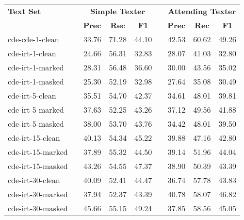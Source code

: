\begin{tabular}{ l c r r r c r r r }
    \toprule

    \multicolumn{1}{l}{\textbf{Text Set}} & \phantom &
    \multicolumn{3}{c}{\textbf{Simple Texter}} & \phantom &
    \multicolumn{3}{c}{\textbf{Attending Texter}} \\

    \cmidrule{3-5}
    \cmidrule{7-9}

    \multicolumn{1}{c}{} & \phantom{abc} &
    \multicolumn{1}{c}{\textbf{Prec}} &
    \multicolumn{1}{c}{\textbf{Rec}} &
    \multicolumn{1}{c}{\textbf{F1}} & \phantom{abc} &
    \multicolumn{1}{c}{\textbf{Prec}} &
    \multicolumn{1}{c}{\textbf{Rec}} &
    \multicolumn{1}{c}{\textbf{F1}} \\

    \midrule

    cde-cde-1-clean   && 33.76 & 71.28 & 44.10 && 42.53 & 60.62 & 49.26 \\

    \addlinespace

    cde-irt-1-clean   && 24.66 & 56.31 & 32.83 && 28.07 & 41.03 & 32.80 \\
    cde-irt-1-marked  && 28.31 & 56.48 & 36.60 && 30.00 & 43.56 & 35.02 \\
    cde-irt-1-masked  && 25.30 & 52.19 & 32.98 && 27.64 & 35.08 & 30.49 \\

    \addlinespace

    cde-irt-5-clean   && 35.51 & 54.70 & 42.37 && 34.61 & 48.01 & 39.81 \\
    cde-irt-5-marked  && 37.63 & 52.25 & 43.26 && 37.12 & 49.56 & 41.88 \\
    cde-irt-5-masked  && 38.00 & 53.70 & 43.76 && 34.42 & 48.01 & 39.50 \\

    \addlinespace

    cde-irt-15-clean  && 40.13 & 54.34 & 45.22 && 39.88 & 47.16 & 42.80 \\
    cde-irt-15-marked && 37.89 & 55.32 & 44.50 && 39.14 & 51.96 & 44.04 \\
    cde-irt-15-masked && 43.26 & 54.55 & 47.37 && 38.90 & 50.39 & 43.39 \\

    \addlinespace

    cde-irt-30-clean  && 40.09 & 52.41 & 44.47 && 36.74 & 57.78 & 43.83 \\
    cde-irt-30-marked && 37.94 & 52.37 & 43.39 && 40.78 & 58.07 & 46.82 \\
    cde-irt-30-masked && 45.66 & 55.15 & 49.24 && 37.85 & 58.56 & 45.05 \\


\end{tabular}
